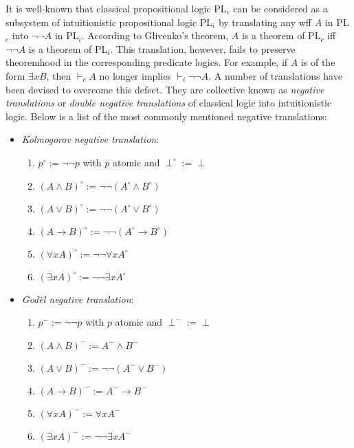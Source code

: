 \documentclass[12pt]{article}
\begin{document}
It is well-known that classical propositional logic PL$_c$ can be considered as a subsystem of intuitionistic propositional logic PL$_i$ by translating any wff $A$ in PL$_c$ into $\neg \neg A$ in PL$_i$.  According to Glivenko's theorem, $A$ is a theorem of PL$_c$ iff $\neg \neg A$ is a theorem of PL$_i$.  This translation, however, fails to preserve theoremhood in the corresponding predicate logics.  For example, if $A$ is of the form $\exists x B$, then $\vdash_c A$ no longer implies $\vdash_i \neg \neg A$.  A number of translations have been devised to overcome this defect.  They are collective known as \emph{negative translations} or \emph{double negative translations} of classical logic into intuitionistic logic.  Below is a list of the most commonly mentioned negative translations:
\begin{itemize}
\item \emph{Kolmogorov negative translation}:
\begin{multicols}{2}
\begin{enumerate}
\item $p^{\circ}:= \neg \neg p$ with $p$ atomic and $\perp^{\circ}:=\perp$
\item $(A\land  B)^{\circ}:=\neg \neg (A^{\circ}\land B^{\circ})$
\item $(A\lor B)^{\circ}:=\neg \neg (A^{\circ} \lor B^{\circ})$
\item $(A\to B)^{\circ}:=\neg \neg (A^{\circ}\to B^{\circ})$
\item $(\forall x A)^{\circ}:=\neg\neg \forall x A^{\circ}$
\item $(\exists x A)^{\circ}:=\neg\neg \exists x A^{\circ}$
\end{enumerate}
\end{multicols}
\item \emph{God\"el negative translation}:
\begin{multicols}{2}
\begin{enumerate}
\item $p^-:= \neg \neg p$ with $p$ atomic and $\perp^-:=\perp$
\item $(A\land  B)^-:=A^-\land B^-$
\item $(A\lor B)^-:=\neg \neg (A^- \lor B^-)$
\item $(A\to B)^-:=A^-\to B^-$
\item $(\forall x A)^-:=\forall x A^-$
\item $(\exists x A)^-:=\neg\neg \exists x A^-$
\end{enumerate}
\end{multicols}

\end{itemize}
\end{document}
